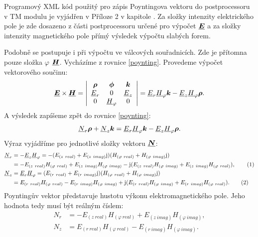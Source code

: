 \documentclass[12pt,a4paper,oneside]{article}
\numberwithin{equation}{section} %
\numberwithin{figure}{section} %
\numberwithin{table}{section} %
\newcommand{\mj}{\mathrm{j}} %
\renewcommand{\vec}[1]{\mbox{\boldmath$#1$}} %
\newcommand{\faz}[1]{{\underline{#1}}} %
\newcommand\numberthis{\addtocounter{equation}{1}\tag{\theequation}}
\begin{document}
Programový XML kód použitý pro zápis Poyntingova vektoru do postprocessoru v TM modulu je vyjádřen v Příloze 2 v kapitole . Za složky intenzity elektrického pole je zde dosazeno z části postprocessoru určené pro výpočet $\faz{\vec{E}}$ a za složky intenzity magnetického pole přímý výsledek výpočtu slabých forem.


Podobně se postupuje i při výpočtu ve válcových souřadnicích. Zde je přítomna pouze složka $\varphi$ $\faz{\vec{H}}$. Vycházíme z rovnice \ref{poynting}. Provedeme výpočet vektorového součinu:
\begin{equation}
\faz{\vec{E}} \times \faz{\vec{H}} =
\left| 
\begin{array}{c c c}
\vec{\rho} & \vec{\phi} & \vec{k} \\ 
\faz{E} _r & 0 & \faz{E} _z \\
0 & \faz{H} _{\varphi} & 0
\end{array}
\right|
= \faz{E} _r \faz{H} _{\varphi} \vec{k} - \faz{E} _z \faz{H} _{\varphi} \vec{\rho} .
\end{equation}
A výsledek zapíšeme zpět do rovnice \ref{poynting}:
\begin{equation}
\faz{N} _r \vec{\rho} + \faz{N} _z \vec{k} = \faz{E} _r \faz{H} _{\varphi} \vec{k} - \faz{E} _z \faz{H} _{\varphi} \vec{\rho} .
\end{equation}
Výraz vyjádříme pro jednotlivé složky vektoru $\faz{\vec{N}}$:
\begin{subequations}
\begin{align*}
\faz{N} _r &= - \faz{E} _z \faz{H} _{\varphi} = - (E _{(z~real)} + E _{(z~imag)} \mj) (H _{(\varphi ~real)} + H _{(\varphi ~imag)} \mj) 
\\
&= - E _{(z~real)} H _{(\varphi ~real)} + E _{(z~imag)} H _{(\varphi ~imag)} - \mj (E _{(z~real)} H _{(\varphi ~imag)} + E _{(z~imag)} H _{(\varphi ~real)}) ,
\numberthis
\\
\faz{N} _z &= \faz{E} _r \faz{H} _{\varphi} = (E _{(r~real)} + E _{(r~imag)} \mj) (H _{(\varphi ~real)} + H _{(\varphi ~imag)} \mj)
\\ 
&= E _{(r~real)} H _{(\varphi ~real)} - E _{(r~imag)} H _{(\varphi ~imag)} + \mj (E _{(r~real)} H _{(\varphi ~imag)} + E _{(r~imag)} H _{(\varphi ~real)}) .
\numberthis
\end{align*}
\end{subequations}
Poyntingův vektor představuje hustotu výkonu elektromagnetického pole. Jeho hodnota tedy musí být reálným číslem:
\begin{subequations}
\begin{align}
N _r &= - E _{(z~real)} H _{(\varphi ~real)} + E _{(z~imag)} H _{(\varphi ~imag)} ,
\\
N _z &= E _{(r~real)} H _{(\varphi ~real)} - E _{(r~imag)} H _{(\varphi ~imag)} .
\end{align}
\end{subequations}
\end{document}

